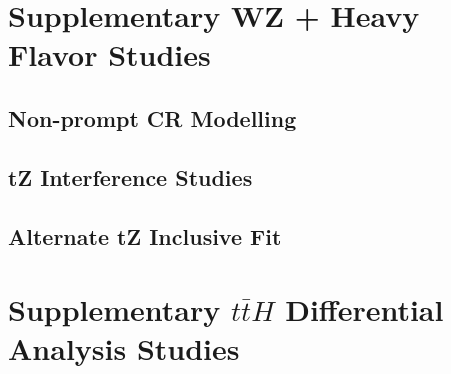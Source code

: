 \documentclass[12pt]{report}	%
\theoremstyle{definition}
\theoremstyle{remark}
\begin{document}
\section{Supplementary WZ + Heavy Flavor Studies}
\label{apx:WZ}

\subsection{Non-prompt CR Modelling}
\label{sec:fakeCR_plots}


\subsection{tZ Interference Studies}
\label{sec:tZInt}

                                                                                                                             
\subsection{Alternate tZ Inclusive Fit}
\label{sec:inc_tZ}

                                                                                                                             
\section{Supplementary $t\bar{t}H$ Differential Analysis Studies}                                                            
\label{apx:MVA}                                                                                        
                                                                                    
% 


\nocite{*}      %
  
\end{document}
